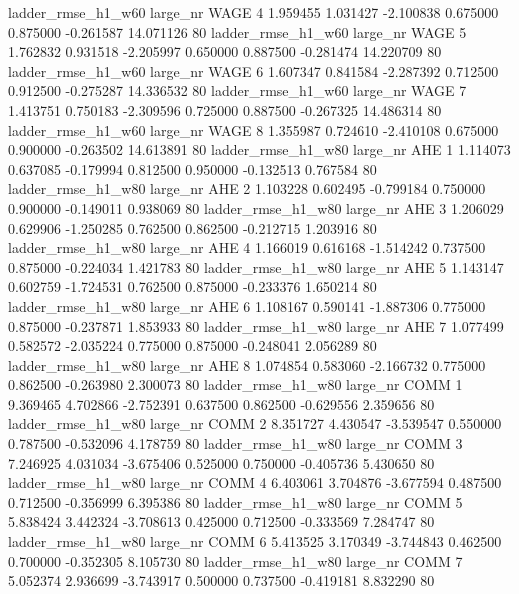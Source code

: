  ladder_rmse_h1_w60   large_nr     WAGE                 4  1.959455  1.031427  -2.100838 0.675000 0.875000 -0.261587   14.071126 80
 ladder_rmse_h1_w60   large_nr     WAGE                 5  1.762832  0.931518  -2.205997 0.650000 0.887500 -0.281474   14.220709 80
 ladder_rmse_h1_w60   large_nr     WAGE                 6  1.607347  0.841584  -2.287392 0.712500 0.912500 -0.275287   14.336532 80
 ladder_rmse_h1_w60   large_nr     WAGE                 7  1.413751  0.750183  -2.309596 0.725000 0.887500 -0.267325   14.486314 80
 ladder_rmse_h1_w60   large_nr     WAGE                 8  1.355987  0.724610  -2.410108 0.675000 0.900000 -0.263502   14.613891 80
 ladder_rmse_h1_w80   large_nr      AHE                 1  1.114073  0.637085  -0.179994 0.812500 0.950000 -0.132513    0.767584 80
 ladder_rmse_h1_w80   large_nr      AHE                 2  1.103228  0.602495  -0.799184 0.750000 0.900000 -0.149011    0.938069 80
 ladder_rmse_h1_w80   large_nr      AHE                 3  1.206029  0.629906  -1.250285 0.762500 0.862500 -0.212715    1.203916 80
 ladder_rmse_h1_w80   large_nr      AHE                 4  1.166019  0.616168  -1.514242 0.737500 0.875000 -0.224034    1.421783 80
 ladder_rmse_h1_w80   large_nr      AHE                 5  1.143147  0.602759  -1.724531 0.762500 0.875000 -0.233376    1.650214 80
 ladder_rmse_h1_w80   large_nr      AHE                 6  1.108167  0.590141  -1.887306 0.775000 0.875000 -0.237871    1.853933 80
 ladder_rmse_h1_w80   large_nr      AHE                 7  1.077499  0.582572  -2.035224 0.775000 0.875000 -0.248041    2.056289 80
 ladder_rmse_h1_w80   large_nr      AHE                 8  1.074854  0.583060  -2.166732 0.775000 0.862500 -0.263980    2.300073 80
 ladder_rmse_h1_w80   large_nr     COMM                 1  9.369465  4.702866  -2.752391 0.637500 0.862500 -0.629556    2.359656 80
 ladder_rmse_h1_w80   large_nr     COMM                 2  8.351727  4.430547  -3.539547 0.550000 0.787500 -0.532096    4.178759 80
 ladder_rmse_h1_w80   large_nr     COMM                 3  7.246925  4.031034  -3.675406 0.525000 0.750000 -0.405736    5.430650 80
 ladder_rmse_h1_w80   large_nr     COMM                 4  6.403061  3.704876  -3.677594 0.487500 0.712500 -0.356999    6.395386 80
 ladder_rmse_h1_w80   large_nr     COMM                 5  5.838424  3.442324  -3.708613 0.425000 0.712500 -0.333569    7.284747 80
 ladder_rmse_h1_w80   large_nr     COMM                 6  5.413525  3.170349  -3.744843 0.462500 0.700000 -0.352305    8.105730 80
 ladder_rmse_h1_w80   large_nr     COMM                 7  5.052374  2.936699  -3.743917 0.500000 0.737500 -0.419181    8.832290 80
